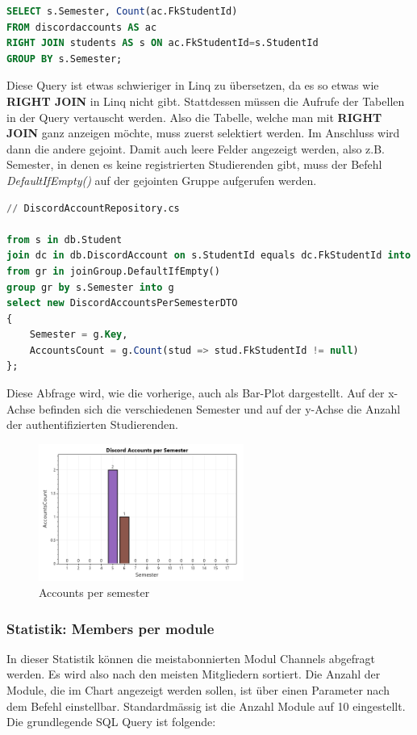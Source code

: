 \documentclass[a4paper, table]{article}
\begin{document}
\begin{lstlisting}[language=SQL]
SELECT s.Semester, Count(ac.FkStudentId)
FROM discordaccounts AS ac
RIGHT JOIN students AS s ON ac.FkStudentId=s.StudentId
GROUP BY s.Semester;
\end{lstlisting}

Diese Query ist etwas schwieriger in Linq zu übersetzen, da es so etwas wie \textbf{RIGHT JOIN}  in Linq nicht gibt. 
Stattdessen müssen die Aufrufe der Tabellen in der Query vertauscht werden. 
Also die Tabelle, welche man mit \textbf{RIGHT JOIN}  ganz anzeigen möchte, muss zuerst selektiert werden. 
Im Anschluss wird dann die andere gejoint.
Damit auch leere Felder angezeigt werden, also z.B. Semester, in denen es keine registrierten Studierenden gibt, muss der Befehl \textit{DefaultIfEmpty()} auf der gejointen Gruppe aufgerufen werden.

\begin{lstlisting}[language=SQL]
// DiscordAccountRepository.cs

from s in db.Student
join dc in db.DiscordAccount on s.StudentId equals dc.FkStudentId into joinGroup
from gr in joinGroup.DefaultIfEmpty()
group gr by s.Semester into g
select new DiscordAccountsPerSemesterDTO
{
    Semester = g.Key,
    AccountsCount = g.Count(stud => stud.FkStudentId != null)
};
\end{lstlisting}

Diese Abfrage wird, wie die vorherige, auch als Bar-Plot dargestellt. 
Auf der x-Achse befinden sich die verschiedenen Semester und auf der y-Achse die Anzahl der authentifizierten Studierenden.

\begin{figure}[h]
    \centering
    \includegraphics[width=0.6\textwidth]{img/accountsPerSemester.png}
    \caption{Accounts per semester}
    \label{fig:accounts-per-semester}
\end{figure}

\clearpage
\subsubsection*{Statistik: Members per module}
In dieser Statistik können die meistabonnierten Modul Channels abgefragt werden. 
Es wird also nach den meisten Mitgliedern sortiert. 
Die Anzahl der Module, die im Chart angezeigt werden sollen, ist über einen Parameter nach dem Befehl einstellbar. 
Standardmässig ist die Anzahl Module auf 10 eingestellt.\\
Die grundlegende SQL Query ist folgende:
\end{document}
